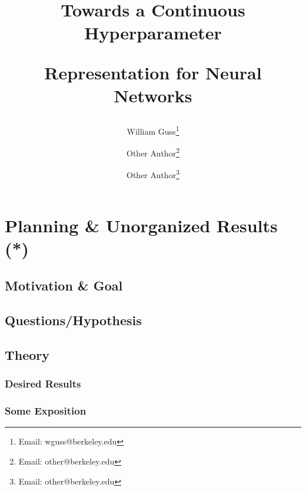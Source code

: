 \documentclass[12pt]{article}
\title{
 \begin{minipage}[c]{1.05\textwidth}
 	\centerline{Towards a Continuous Hyperparameter}
 	\centerline{Representation for Neural Networks}
 \end{minipage}
}
\author{
	\vspace{1cm}
	William Guss\thanks{Email: wguss@berkeley.edu} \and
	Other Author\thanks{Email: other@berkeley.edu} \and 
	Other Author\thanks{Email: other@berkeley.edu}
}
\newif\ifdraft
\begin{document}
\maketitle
\thispagestyle{empty}

\begin{abstract}
% 
\end{abstract}

\ifdraft
\newpage

\fi

\newpage
\thispagestyle{empty}

{\large
{}
\vspace*{\fill}
\tableofcontents
\vspace*{\fill}
}

\newpage

\setcounter{page}{1}


\section{Planning \& Unorganized Results (*)}
\subsection{Motivation \& Goal}

\subsection{Questions/Hypothesis}

\subsection{Theory}

\subsubsection{Desired Results}

\subsubsection{Some Exposition}
\end{document}
